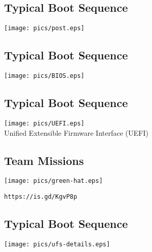 \documentclass[xga]{xdvislides}
\begin{document}
\subsection{Typical Boot Sequence}
\vspace*{\fill}
\begin{center}
	\texttt{[image: pics/post.eps]} \\
\end{center}
\vspace*{\fill}

\subsection{Typical Boot Sequence}
\vspace*{\fill}
\begin{center}
	\texttt{[image: pics/BIOS.eps]} \\
\end{center}
\vspace*{\fill}

\subsection{Typical Boot Sequence}
\vspace*{\fill}
\begin{center}
	\texttt{[image: pics/UEFI.eps]} \\
Unified Extensible Firmware Interface (UEFI)
\end{center}
\vspace*{\fill}

\subsection{Team Missions}
\vspace*{\fill}
\begin{center}
\texttt{[image: pics/green-hat.eps]}
\end{center}
{\tt https://is.gd/KgvP8p}
\vspace*{\fill}


\subsection{Typical Boot Sequence}
\vspace*{\fill}
\begin{center}
	\texttt{[image: pics/ufs-details.eps]} \\
\end{center}
\vspace*{\fill}
\end{document}
